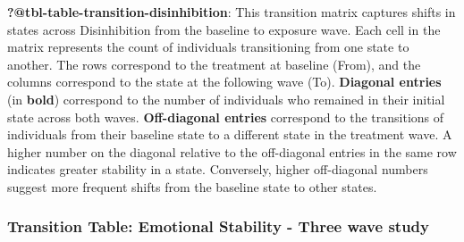 \documentclass[
  singlecolumn]{article}
\begin{document}
\textbf{?@tbl-table-transition-disinhibition}: This transition matrix
captures shifts in states across Disinhibition from the baseline to
exposure wave. Each cell in the matrix represents the count of
individuals transitioning from one state to another. The rows correspond
to the treatment at baseline (From), and the columns correspond to the
state at the following wave (To). \textbf{Diagonal entries} (in
\textbf{bold}) correspond to the number of individuals who remained in
their initial state across both waves. \textbf{Off-diagonal entries}
correspond to the transitions of individuals from their baseline state
to a different state in the treatment wave. A higher number on the
diagonal relative to the off-diagonal entries in the same row indicates
greater stability in a state. Conversely, higher off-diagonal numbers
suggest more frequent shifts from the baseline state to other states.

\subsubsection{Transition Table: Emotional Stability - Three wave
study}\label{transition-table-emotional-stability---three-wave-study}
\end{document}
